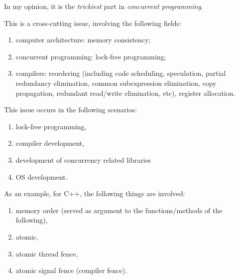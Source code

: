 \documentclass{article}
\begin{document}
In my opinion, it is the \emph{trickiest} part in \emph{concurrent programming}.

This is a cross-cutting issue, involving the following fields:
\begin{enumerate}
    \item computer architecture: memory consistency;
    \item concurrent programming: lock-free programming;
    \item compilers: reordering (including code scheduling, speculation, partial redundancy elimination, common subexpression elimination, copy propagation, redundant read/write elimination, etc), register allocation.
\end{enumerate}
This issue occurs in the following scenarios:
\begin{enumerate}
    \item lock-free programming,
    \item compiler development,
    \item development of concurrency
    related libraries
    \item OS development.
\end{enumerate}

As an example, for C++, the following things are involved:
\begin{enumerate}
    \item memory order (served as argument to the functions/methods of the following),
    \item atomic,
    \item atomic thread fence,
    \item atomic signal fence (compiler fence).
\end{enumerate}
\end{document}
